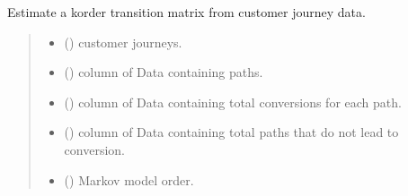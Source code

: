 \documentclass[letterpaper,10pt,english]{sphinxmanual}
\begin{document}
\begin{fulllineitems}
\label{\detokenize{index:ChannelAttribution.transition_matrix}}
\pysigstartsignatures
\pysiglinewithargsret
{}
{\sphinxparamcomma {}\sphinxparamcomma {}\sphinxparamcomma {}\sphinxparamcomma {}\sphinxparamcomma {}\sphinxparamcomma {}\sphinxparamcomma {}}
{}
\pysigstopsignatures
\sphinxAtStartPar
Estimate a k\sphinxhyphen{}order transition matrix from customer journey data.
\begin{quote}\begin{description}
\begin{itemize}
\item {} 
\sphinxAtStartPar
{} () \textendash{} customer journeys.

\item {} 
\sphinxAtStartPar
{} () \textendash{} column of Data containing paths.

\item {} 
\sphinxAtStartPar
{} () \textendash{} column of Data containing total conversions for each path.

\item {} 
\sphinxAtStartPar
{} () \textendash{} column of Data containing total paths that do not lead to conversion.

\item {} 
\sphinxAtStartPar
{} (\sphinxstyleliteralemphasis{\sphinxupquote{, }}) \textendash{} Markov model order.


\end{itemize}
\end{description}
\end{quote}
\end{fulllineitems}
\end{document}
